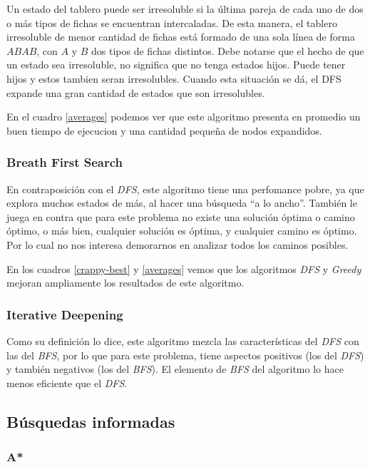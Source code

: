 \documentclass[a4paper,10pt]{article}
\begin{document}
    Un estado del tablero puede ser irresoluble si la última pareja de cada uno de dos o más tipos de fichas se encuentran intercaladas.
    De esta manera, el tablero irresoluble de menor cantidad de fichas está formado de una sola línea de forma $ABAB$, con $A$ y $B$ dos tipos de fichas distintos.
    Debe notarse que el hecho de que un estado sea irresoluble, no significa que no tenga estados hijos.
    Puede tener hijos y estos tambien seran irresolubles.
    Cuando esta situación se dá, el DFS expande una gran cantidad de estados que son irresolubles.

    En el cuadro \ref{averages} podemos ver que este algoritmo presenta en promedio un buen tiempo de ejecucion y una cantidad pequeña de nodos expandidos.
    
    \subsubsection{Breath First Search}
    En contraposición con el \textit{DFS}, este algoritmo tiene una perfomance pobre, ya que explora muchos estados de más, al hacer una búsqueda ``a lo ancho''.
    También le juega en contra que para este problema no existe una solución óptima o camino óptimo, o más bien, cualquier solución es óptima, y cualquier camino es óptimo. 
    Por lo cual no nos interesa demorarnos en analizar todos los caminos posibles.

    En los cuadros \ref{crappy-best} y \ref{averages} vemos que los algoritmos \textit{DFS} y \textit{Greedy} mejoran ampliamente los resultados de este algoritmo.

    \subsubsection{Iterative Deepening}

    Como su definición lo dice, este algoritmo mezcla las características del \textit{DFS} con las del \textit{BFS}, por lo que para este problema, tiene aspectos positivos (los del 
    \textit{DFS}) y también negativos (los del \textit{BFS}). 
    El elemento de \textit{BFS} del algoritmo lo hace menos eficiente que el \textit{DFS}.

\subsection{Búsquedas informadas}
    
    \subsubsection{A*}
    
\end{document}
